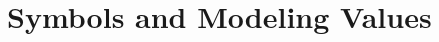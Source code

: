 \documentclass[11pt]{article}
\begin{document}
	\section{Symbols and Modeling Values}
	
	
\end{document}
